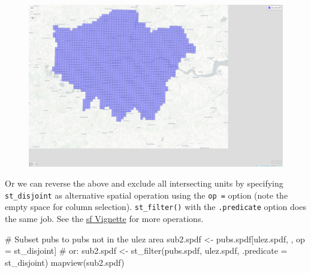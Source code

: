 \documentclass[
  letterpaper,
  DIV=11,
  numbers=noendperiod]{scrreprt}
\newenvironment{Shaded}{\begin{snugshade}}{\end{snugshade}}
\newcommand{\AttributeTok}[1]{\textcolor[rgb]{0.40,0.45,0.13}{#1}}
\newcommand{\CommentTok}[1]{\textcolor[rgb]{0.37,0.37,0.37}{#1}}
\newcommand{\FunctionTok}[1]{\textcolor[rgb]{0.28,0.35,0.67}{#1}}
\newcommand{\NormalTok}[1]{\textcolor[rgb]{0.00,0.23,0.31}{#1}}
\newcommand{\OtherTok}[1]{\textcolor[rgb]{0.00,0.23,0.31}{#1}}
\begin{document}
\begin{figure}[H]

{\centering \includegraphics{01_refresher_short_files/figure-pdf/unnamed-chunk-24-1.pdf}

}

\end{figure}

Or we can reverse the above and exclude all intersecting units by
specifying \texttt{st\_disjoint} as alternative spatial operation using
the \texttt{op\ =} option (note the empty space for column selection).
\texttt{st\_filter()} with the \texttt{.predicate} option does the same
job. See the
\href{https://cran.r-project.org/web/packages/sf/vignettes/sf3.html}{sf
Vignette} for more operations.

\begin{Shaded}
\begin{Highlighting}[]
\CommentTok{\# Subset pubs to pubs not in the ulez area}
\NormalTok{sub2.spdf }\OtherTok{\textless{}{-}}\NormalTok{ pubs.spdf[ulez.spdf, , op }\OtherTok{=}\NormalTok{ st\_disjoint] }\CommentTok{\# or:}
\NormalTok{sub2.spdf }\OtherTok{\textless{}{-}} \FunctionTok{st\_filter}\NormalTok{(pubs.spdf, ulez.spdf, }\AttributeTok{.predicate =}\NormalTok{ st\_disjoint)}
\FunctionTok{mapview}\NormalTok{(sub2.spdf)}
\end{Highlighting}
\end{Shaded}
\end{document}
